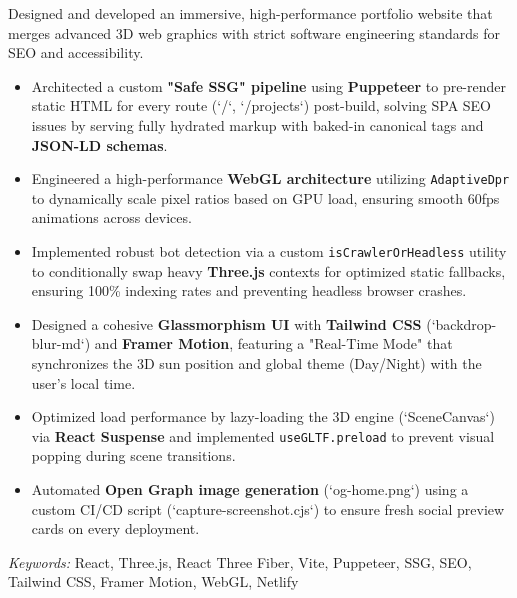 \nointent
{}

\nointent
Designed and developed an immersive, high-performance portfolio website that merges advanced 3D web graphics with strict software engineering standards for SEO and accessibility.

\begin{itemize}
    \item Architected a custom \textbf{"Safe SSG" pipeline} using \textbf{Puppeteer} to pre-render static HTML for every route (`/`, `/projects`) post-build, solving SPA SEO issues by serving fully hydrated markup with baked-in canonical tags and \textbf{JSON-LD schemas}.
    \item Engineered a high-performance \textbf{WebGL architecture} utilizing \texttt{AdaptiveDpr} to dynamically scale pixel ratios based on GPU load, ensuring smooth 60fps animations across devices.
    \item Implemented robust bot detection via a custom \texttt{isCrawlerOrHeadless} utility to conditionally swap heavy \textbf{Three.js} contexts for optimized static fallbacks, ensuring 100\% indexing rates and preventing headless browser crashes.
    \item Designed a cohesive \textbf{Glassmorphism UI} with \textbf{Tailwind CSS} (`backdrop-blur-md`) and \textbf{Framer Motion}, featuring a "Real-Time Mode" that synchronizes the 3D sun position and global theme (Day/Night) with the user's local time.
    \item Optimized load performance by lazy-loading the 3D engine (`SceneCanvas`) via \textbf{React Suspense} and implemented \texttt{useGLTF.preload} to prevent visual popping during scene transitions.
    \item Automated \textbf{Open Graph image generation} (`og-home.png`) using a custom CI/CD script (`capture-screenshot.cjs`) to ensure fresh social preview cards on every deployment.
\end{itemize}

\nointent
\textit{Keywords:} React, Three.js, React Three Fiber, Vite, Puppeteer, SSG, SEO, Tailwind CSS, Framer Motion, WebGL, Netlify

\vspace{1em}
